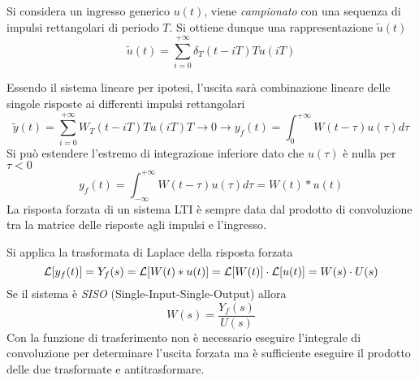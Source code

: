 Si considera un ingresso generico $u(t)$, viene \textit{campionato} con una
sequenza di impulsi rettangolari di periodo $T$.
Si ottiene dunque una rappresentazione $\tilde{u}(t)$
$$
\tilde{u}(t) = \sum_{i=0}^{+\infty}\delta_T(t-iT)Tu(iT)
$$

\begin{figure}[h]
\centering
{}
\end{figure}

Essendo il sistema lineare per ipotesi, l'uscita sarà combinazione
lineare delle singole risposte ai differenti impulsi rettangolari
$$
\tilde{y}(t) = \sum_{i=0}^{+\infty} W_T(t-iT)Tu(iT)
\stackrel{}T\to 0{\longrightarrow} y_f(t) =
\int_0^{+\infty} W(t-\tau)u(\tau)d\tau
$$
Si può estendere l'estremo di integrazione inferiore dato che $u(\tau)$ è nulla
per $\tau<0$
$$
y_f(t) = \int_{-\infty}^{+\infty}W(t-\tau)u(\tau)d\tau = W(t)*u(t)
$$
La risposta forzata di un sistema LTI è sempre data dal prodotto di
convoluzione tra la matrice delle risposte agli impulsi e l'ingresso.

Si applica la trasformata di Laplace della risposta forzata
$$
\mathcal{L}[y_f(t)] = Y_f(s) = \mathcal{L}[W(t)*u(t)] = \mathcal{L}[W(t)]\cdot \mathcal{L}[u(t)] = W(s)
\cdot U(s)
$$
Se il sistema è \textit{SISO} (Single-Input-Single-Output) allora
$$
W(s) = \frac{Y_f(s)}{U(s)}
$$
Con la funzione di trasferimento non è necessario eseguire l'integrale di
convoluzione per determinare l'uscita forzata ma è sufficiente eseguire il
prodotto delle due trasformate e antitrasformare.


